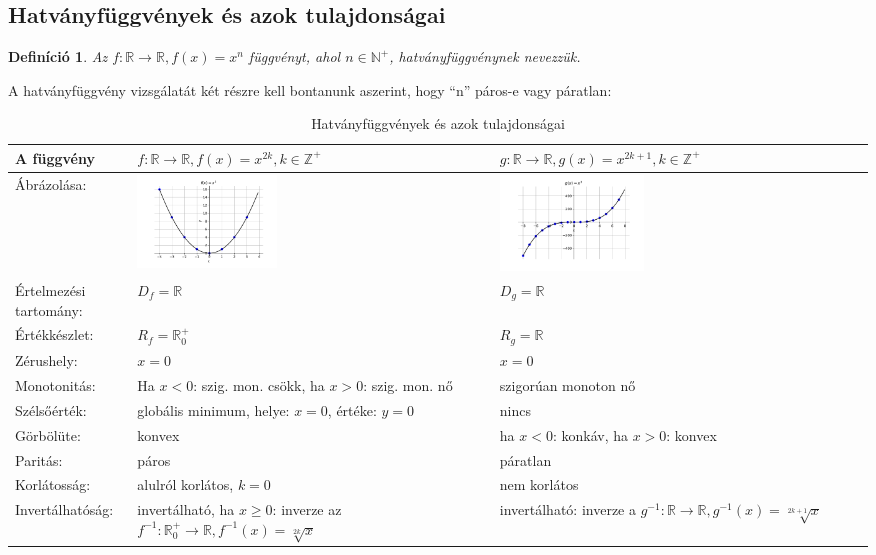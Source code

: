 \documentclass[12pt,a4paper]{article}
\newtheorem{definition}{Definíció} [section]
\begin{document}
\subsection{Hatványfüggvények és azok tulajdonságai}
\begin{definition}
Az $f:\mathbb{R}\rightarrow\mathbb{R}, f(x)=x^n$ függvényt, ahol $n\in \mathbb{N}^+$, hatványfüggvénynek nevezzük.
\end{definition}
A hatványfüggvény vizsgálatát két részre kell bontanunk aszerint, hogy ``n'' páros-e vagy páratlan:
\begin{table}[h!]
\centering
\begin{tabular}{ | m{3cm} || m{6cm} | m{6cm} | }
A függvény & $f:\mathbb{R}\rightarrow\mathbb{R}, f(x)=x^{2k}, k\in \mathbb{Z}^+$ & $g:\mathbb{R}\rightarrow\mathbb{R}, g(x)=x^{2k+1}, k\in \mathbb{Z}^+$ \\
\hline
Ábrázolása: &\centering \includegraphics[width=0.4\textwidth]{chart/2021-10-31--10:23:29} & \includegraphics[width=0.4\textwidth]{chart/2021-10-31--10:27:55}\\
\hline
Értelmezési tartomány: & $D_f=\mathbb{R}$ & $D_g=\mathbb{R}$ \\
\hline
Értékkészlet: & $R_f=\mathbb{R}_0^+$ & $R_g=\mathbb{R}$\\
\hline
Zérushely: & $x = 0$& $x = 0$\\
\hline
Monotonitás: &Ha $x<0$: szig. mon. csökk, ha $x>0$: szig. mon. nő&szigorúan monoton nő \\
\hline
Szélsőérték: & globális minimum, helye: $x=0$, értéke: $y=0$ & nincs\\
\hline
Görbölüte: & konvex & ha $x < 0$: konkáv, ha $x > 0$: konvex\\
\hline
Paritás: & páros & páratlan \\
\hline
Korlátosság: & alulról korlátos, $k=0$ & nem korlátos \\
\hline
Invertálhatóság: & invertálható, ha $x \geq 0$: inverze az $f^{-1}:\mathbb{R}^+_0\to \mathbb{R}, f^{-1}(x)=\sqrt[2k]{x}$& invertálható: inverze a $g^{-1}:\mathbb{R}\to \mathbb{R}, g^{-1}(x)=\sqrt[2k+1]{x}$ \\
\end{tabular}
\caption{Hatványfüggvények és azok tulajdonságai}
\label{table:hatv_fugg}
\end{table}
\end{document}
